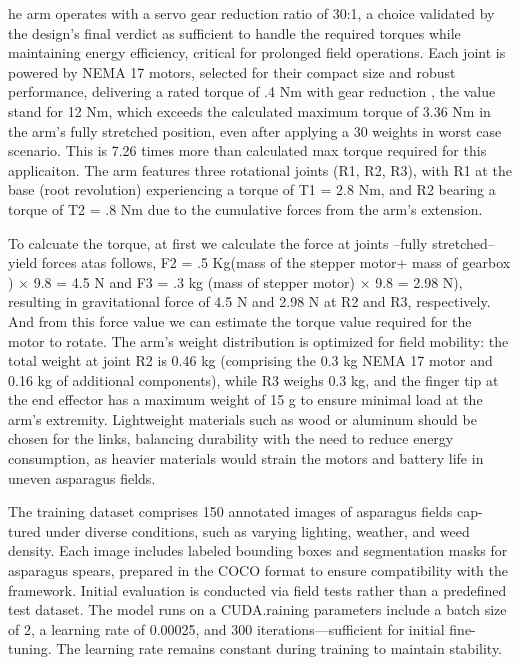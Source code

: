 he arm operates with a servo gear reduction ratio of
30:1, a choice validated by the design’s final verdict as sufficient to handle the
required torques while maintaining energy efficiency, critical for prolonged
field operations. Each joint is powered by NEMA 17 motors, selected for
their compact size and robust performance, delivering a rated torque of .4 Nm
with gear reduction , the value stand for 12 Nm, which exceeds the calculated
maximum torque of 3.36 Nm in the arm’s fully stretched position, even after
applying a 30%
weights in worst case scenario. This is 7.26 times more than calculated max
torque required for this applicaiton. The arm features three rotational joints
(R1, R2, R3), with R1 at the base (root revolution) experiencing a torque of
T1 = 2.8 Nm, and R2 bearing a torque of T2 = .8 Nm due to the cumulative
forces from the arm’s extension.



To calcuate the torque, at first we calculate the force at joints –fully stretched–
yield forces atas follows, F2 = .5 Kg(mass of the stepper motor+ mass of
gearbox ) × 9.8 = 4.5 N and F3 = .3 kg (mass of stepper motor) × 9.8
= 2.98 N), resulting in gravitational force of 4.5 N and 2.98 N at R2 and
R3, respectively. And from this force value we can estimate the torque value
required for the motor to rotate. The arm’s weight distribution is optimized
for field mobility: the total weight at joint R2 is 0.46 kg (comprising the 0.3
kg NEMA 17 motor and 0.16 kg of additional components), while R3 weighs
0.3 kg, and the finger tip at the end effector has a maximum weight of 15 g
to ensure minimal load at the arm’s extremity. Lightweight materials such as
wood or aluminum should be chosen for the links, balancing durability with
the need to reduce energy consumption, as heavier materials would strain the
motors and battery life in uneven asparagus fields.


The training dataset comprises 150 annotated images of asparagus fields cap-
tured under diverse conditions, such as varying lighting, weather, and weed
density. Each image includes labeled bounding boxes and segmentation masks
for asparagus spears, prepared in the COCO format to ensure compatibility
with the framework. Initial evaluation is conducted via field tests rather than
a predefined test dataset.
The model runs on a CUDA.raining parameters include a batch size of 2, a learning rate of 0.00025, and
300 iterations—sufficient for initial fine-tuning. The learning rate remains
constant during training to maintain stability.